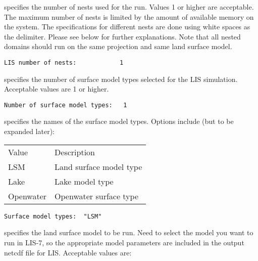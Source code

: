  
  specifies the number of nests used
 for the run.
 Values 1 or higher are acceptable. The maximum number of nests is
 limited by the amount of available memory on the system.
 The specifications for different nests are done using white spaces
 as the delimiter. Please see below for further explanations. Note
 that all nested domains should run on the same projection and same
 land surface model.
 

 \begin{Verbatim}[frame=single]
LIS number of nests:            1
 \end{Verbatim}

 
  specifies the number of 
 surface model types selected for the LIS simulation.
 Acceptable values are 1 or higher.
 

 \begin{Verbatim}[frame=single]
Number of surface model types:   1 
 \end{Verbatim}

 
  specifies the names of the surface
 model types. Options include (but to be expanded later):

 \begin{tabular}{ll}
 Value   & Description                \\
 LSM     &  Land surface model type   \\
 
 Lake    &  Lake model type           \\
 
 Openwater &  Openwater surface type  \\
 \end{tabular}
 

 \begin{Verbatim}[frame=single]
Surface model types:  "LSM"
 \end{Verbatim}

 
  specifies the land surface model to be run.
  Need to select the model you want to run in LIS-7, so the appropriate
  model parameters are included in the output netcdf file for LIS.
 Acceptable values are:

